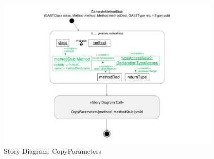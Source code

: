 \begin{figure}[hbtp]
\centering
\includegraphics[width=\linewidth]{./figures/SDCopyParameters}
\caption{Story Diagram: CopyParameters}
\label{fig:SDCopyParameters}
\end{figure}